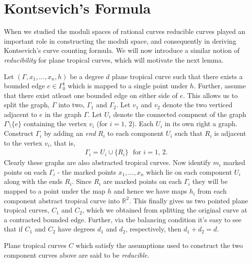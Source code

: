 \section{Kontsevich's Formula}

When we studied the moduli spaces of rational curves reducible curves played an important role in constructing the moduli space, and consequently in deriving Kontsevich's curve counting formula.
We will now introduce a similar notion of \textit{reducibility} for plane tropical curves, which will motivate the next lemma. 

\par Let $(\Gamma, x_{1}, \dots,x_{n}, h)$ be a degree $d$ plane tropical curve such that there exists a bounded edge $e \in \Gamma_{0}^{1}$ which is mapped to a single point under $h$.
Further, assume that there exist atleast one bounded edge on either side of $e$.
This allows us to split the graph, $\Gamma$ into two, $\Gamma_{1}$ and $\Gamma_{2}$.
Let $v_{1}$ and $v_{2}$ denote the two verticed adjacent to $e$ in the graph $\Gamma$.
Let $U_{i}$ denote the connected compnent of the graph $\Gamma \setminus \{e\}$ containing the vertex $v_{i}$ (for $i = 1,\,2$).
Each $U_{i}$ in its own right a graph. 
Construct $\Gamma_{i}$ by adding an \textit{end} $R_{i}$ to each component $U_{i}$ such that $R_{i}$ is adjacent to the vertex $v_{i}$, that is, 
\begin{align*}
    \Gamma_{i} = U_{i} \cup \{R_{i}\}~~~\text{for }i=1,\,2.
\end{align*}
Clearly these graphs are also abstracted tropical curves. 
Now identify $m_{i}$ marked points on each $\Gamma_{i}$ - the marked points $x_{1}, \dots, x_{n}$ which lie on each component $U_{i}$ along with the ends $R_{i}$.
Since $R_{i}$ are marked points on each $\Gamma_{i}$ they will be mapped to a point under the map $h$ and hence we have maps $h_{i}$ from each component abstract tropical curve into $\mathbb{R}^{2}$.
This finally gives us two pointed plane tropical curves, $C_{1}$ and $C_{2}$, which we obtained from splitting the original curve at a contracted bounded edge.
Further, via the balancing condition it's easy to see that if $C_{1}$ and $C_{2}$ have degrees $d_{1}$ and $d_{2}$, respectively, then $d_{1} + d_{2}=d$.

\begin{remark}
    Plane tropical curves $C$ which satisfy the assumptions used to construct the two component curves above are said to be \textit{reducible}.
\end{remark}

